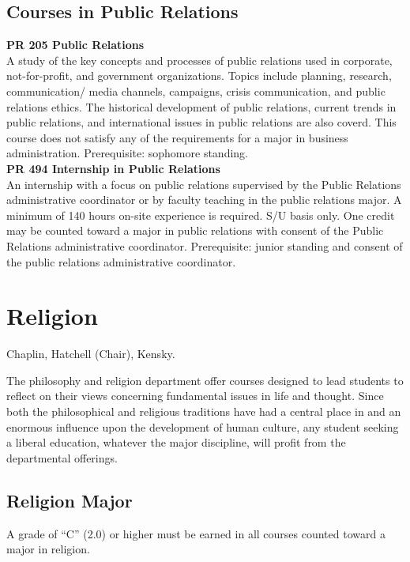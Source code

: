 \documentclass[
  letterpaper,
]{scrbook}
\begin{document}
\subsection{Courses in Public
Relations}\label{courses-in-public-relations}

\textbf{PR 205 Public Relations}\\
A study of the key concepts and processes of public relations used in
corporate, not-for-profit, and government organizations. Topics include
planning, research, communication/ media channels, campaigns, crisis
communication, and public relations ethics. The historical development
of public relations, current trends in public relations, and
international issues in public relations are also coverd. This course
does not satisfy any of the requirements for a major in business
administration. Prerequisite: sophomore standing.\\
\textbf{PR 494 Internship in Public Relations}\\
An internship with a focus on public relations supervised by the Public
Relations administrative coordinator or by faculty teaching in the
public relations major. A minimum of 140 hours on-site experience is
required. S/U basis only. One credit may be counted toward a major in
public relations with consent of the Public Relations administrative
coordinator. Prerequisite: junior standing and consent of the public
relations administrative coordinator.

\section{Religion}\label{sec-religion}

Chaplin, Hatchell (Chair), Kensky.

The philosophy and religion department offer courses designed to lead
students to reflect on their views concerning fundamental issues in life
and thought. Since both the philosophical and religious traditions have
had a central place in and an enormous influence upon the development of
human culture, any student seeking a liberal education, whatever the
major discipline, will profit from the departmental offerings.

\subsection{Religion Major}\label{religion-major}

A grade of ``C'' (2.0) or higher must be earned in all courses counted
toward a major in religion.
\end{document}

